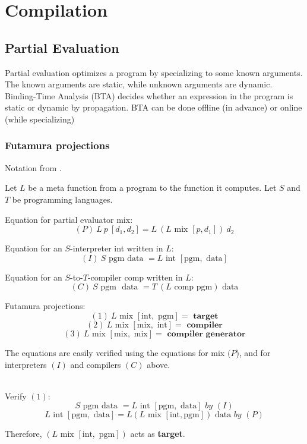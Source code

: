 \chapter{Compilation}

\section{Partial Evaluation}

Partial evaluation optimizes a program by specializing to some known
arguments. The known arguments are static, while unknown arguments are
dynamic. Binding-Time Analysis (BTA) decides whether an expression in
the program is static or dynamic by propagation. BTA can be done
offline (in advance) or online (while specializing)

\subsection{Futamura projections}

Notation from \cite{selfpe}.

\noindent
Let $L$ be a meta function from a program to the function it computes. Let $S$ and $T$ be programming languages.

\noindent
Equation for partial evaluator mix:
$$(P)\ L\ p\ [d_1, d_2] = L\ (L \text{ mix } [p, d_1])\ d_2$$

\noindent
Equation for an $S$-interpreter int written in $L$:
$$(I)\ S \text{ pgm } \text{data } = L \text{ int } [\text{pgm}, \text{ data}]$$

\noindent
Equation for an $S$-to-$T$-compiler comp written in $L$:
$$(C)\ S \text{ pgm } \text{ data } = T\ (L \text{ comp } \text{pgm}) \text{ data}$$

\noindent
Futamura projections:
$$(1)\ L \text{ mix } [\text{int}, \text{ pgm}] = \textbf{ target}$$
$$(2)\ L \text{ mix } [\text{mix}, \text{ int}] = \textbf{ compiler}$$
$$(3)\ L \text{ mix } [\text{mix}, \text{ mix}] = \textbf{ compiler generator}$$

The equations are easily verified using the equations for mix $(P$), and for
interpreters $(I)$ and compilers $(C)$ above.

\ \\

\noindent
Verify $(1)$:
$$S \text{ pgm } \text{data } = L \text{ int } [\text{pgm}, \text{ data}] \textit{ by } (I)$$
$$L \text{ int } [\text{pgm}, \text{ data}] = L (L \text{ mix } [\text{int}, \text{pgm}]) \text{ data} \textit{ by } (P)$$
\begin{center}Therefore, $(L \text{ mix } [\text{int}, \text{ pgm}])$ acts as {\bf target}.\end{center}

